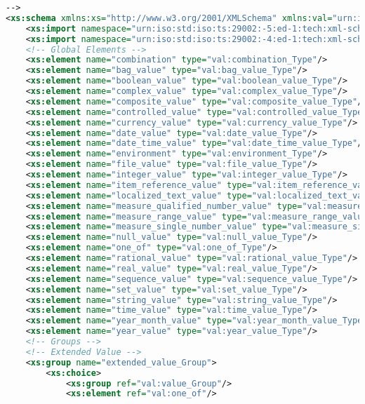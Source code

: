 \begin{lstlisting}[caption=value.xsd, language=XML, label=lst:value_xsd]
-->
<xs:schema xmlns:xs="http://www.w3.org/2001/XMLSchema" xmlns:val="urn:iso:std:iso:ts:29002:-10:ed-1:tech:xml-schema:value" xmlns:bas="urn:iso:std:iso:ts:29002:-4:ed-1:tech:xml-schema:basic" xmlns:id="urn:iso:std:iso:ts:29002:-5:ed-1:tech:xml-schema:identifier" targetNamespace="urn:iso:std:iso:ts:29002:-10:ed-1:tech:xml-schema:value" elementFormDefault="qualified">
	<xs:import namespace="urn:iso:std:iso:ts:29002:-5:ed-1:tech:xml-schema:identifier" schemaLocation="identifier.xsd"/>
	<xs:import namespace="urn:iso:std:iso:ts:29002:-4:ed-1:tech:xml-schema:basic" schemaLocation="basic.xsd"/>
	<!-- Global Elements -->
	<xs:element name="combination" type="val:combination_Type"/>
	<xs:element name="bag_value" type="val:bag_value_Type"/>
	<xs:element name="boolean_value" type="val:boolean_value_Type"/>
	<xs:element name="complex_value" type="val:complex_value_Type"/>
	<xs:element name="composite_value" type="val:composite_value_Type"/>
	<xs:element name="controlled_value" type="val:controlled_value_Type"/>
	<xs:element name="currency_value" type="val:currency_value_Type"/>
	<xs:element name="date_value" type="val:date_value_Type"/>
	<xs:element name="date_time_value" type="val:date_time_value_Type"/>
	<xs:element name="environment" type="val:environment_Type"/>
	<xs:element name="file_value" type="val:file_value_Type"/>
	<xs:element name="integer_value" type="val:integer_value_Type"/>
	<xs:element name="item_reference_value" type="val:item_reference_value_Type"/>
	<xs:element name="localized_text_value" type="val:localized_text_value_Type"/>
	<xs:element name="measure_qualified_number_value" type="val:measure_qualified_number_value_Type"/>
	<xs:element name="measure_range_value" type="val:measure_range_value_Type"/>
	<xs:element name="measure_single_number_value" type="val:measure_single_number_value_Type"/>
	<xs:element name="null_value" type="val:null_value_Type"/>
	<xs:element name="one_of" type="val:one_of_Type"/>
	<xs:element name="rational_value" type="val:rational_value_Type"/>
	<xs:element name="real_value" type="val:real_value_Type"/>
	<xs:element name="sequence_value" type="val:sequence_value_Type"/>
	<xs:element name="set_value" type="val:set_value_Type"/>
	<xs:element name="string_value" type="val:string_value_Type"/>
	<xs:element name="time_value" type="val:time_value_Type"/>
	<xs:element name="year_month_value" type="val:year_month_value_Type"/>
	<xs:element name="year_value" type="val:year_value_Type"/>
	<!-- Groups -->
	<!-- Extended Value -->
	<xs:group name="extended_value_Group">
		<xs:choice>
			<xs:group ref="val:value_Group"/>
			<xs:element ref="val:one_of"/>

\end{lstlisting}
